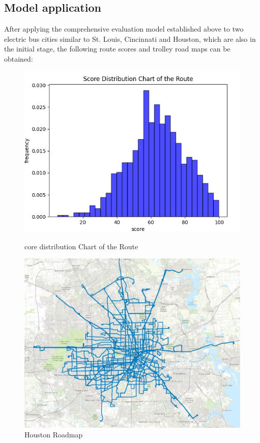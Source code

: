 \documentclass[12pt]{article}
\begin{document}
\subsection{Model application}
After applying the comprehensive evaluation model established above to two electric bus cities similar to St. Louis, 
Cincinnati and Houston, which are also in the initial stage, the following route scores and trolley road maps can be obtained:
\begin{figure}[htbp]
	\centering
	\begin{minipage}{0.49\linewidth}
		\centering
		\includegraphics[width=0.9\linewidth]{score d.png}
		\caption{core distribution Chart of the Route}
		\label{score d.jpg}%
	\end{minipage}

	\begin{minipage}{0.49\linewidth}
		\centering
		\includegraphics[width=0.9\linewidth]{city d.jpg}
		\caption{Houston Roadmap}
		\label{city d.jpg}%
	\end{minipage}


\end{figure}
\end{document}
